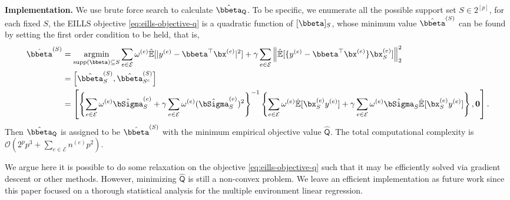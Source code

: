 \documentclass[10pt]{article}
\numberwithin{equation}{section}
\begin{document}
\noindent \textbf{Implementation.} We use brute force search to calculate $\hat{\bbeta}_{\mathsf{Q}}$. To be specific, we enumerate all the possible support set $S\in 2^{[p]}$, for each fixed $S$, the EILLS objective \eqref{eq:eills-objective-q} is a quadratic function of $[\bbeta]_S$, whose minimum value $\hat{\bbeta}^{(S)}$ can be found by setting the first order condition to be held, that is, 
\begin{align*}
        \hat{\bbeta}^{(S)} &= \mathop{\mathrm{argmin}}_{\mathrm{supp}(\bbeta) \subseteq S} \sum_{e\in \mathcal{E}} \omega^{(e)} \hat{\mathbb{E}}[|y^{(e)} - \bbeta^\top \bx^{(e)}|^2] + \gamma \sum_{e\in \mathcal{E}} \left\|\hat{\mathbb{E}}[\{y^{(e)} - \bbeta^\top \bx^{(e)}\}\bx_{S}^{(e)}]\right\|_2^2 \\
        &= \left[\hat{\bbeta}^{(S)}_S, \hat{\bbeta}^{(S)}_{S^c}\right] \\
        &= \left[\left\{\sum_{e\in \mathcal{E}} \omega^{(e)} \hat{\bSigma}^{(e)}_S + \gamma \sum_{e\in \mathcal{E}} \omega^{(e)} (\hat{\bSigma}^{(e)}_S)^2\right\}^{-1} \left\{ \sum_{e\in \mathcal{E}} \omega^{(e)} \hat{\mathbb{E}}[\bx_S^{(e)} y^{(e)}] + \gamma \sum_{e\in \mathcal{E}} \omega^{(e)} \hat{\bSigma}_{S} \hat{\mathbb{E}}[\bx_S^{(e)} y^{(e)}]\right\}, \bm{0} \right].
\end{align*}
Then $\hat{\bbeta}_{\mathsf{Q}}$ is assigned to be $\hat{\bbeta}^{(S)}$ with the minimum empirical objective value $\hat{\mathsf{Q}}$. The total computational complexity is $\mathcal{O}(2^p p^3 + \sum_{e\in \mathcal{E}} n^{(e)} p^2)$.

We argue here it is possible to do some relaxation on the objective \eqref{eq:eills-objective-q} such that it may be efficiently solved via gradient descent or other methods. However, minimizing $\hat{\mathsf{Q}}$ is still a non-convex problem. We leave an efficient implementation as future work since this paper focused on a thorough statistical analysis for the multiple environment linear regression.
\end{document}
